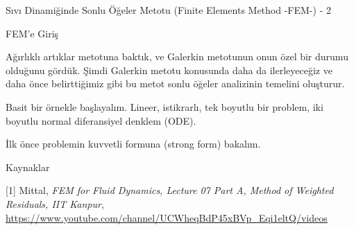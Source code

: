 \documentclass[12pt,fleqn]{article}\usepackage{../../common}
\begin{document}
Sıvı Dinamiğinde Sonlu Öğeler Metotu (Finite Elements Method -FEM-) - 2

FEM'e Giriş

Ağırlıklı artıklar metotuna baktık, ve Galerkin metotunun onun özel bir durumu
olduğunu gördük. Şimdi Galerkin metotu konusunda daha da ilerleyeceğiz ve daha
önce belirttiğimiz gibi bu metot sonlu öğeler analizinin temelini oluşturur.

Basit bir örnekle başlayalım. Lineer, istikrarlı, tek boyutlu bir problem, iki
boyutlu normal diferansiyel denklem (ODE).

İlk önce problemin kuvvetli formuna (strong form) bakalım.



Kaynaklar

[1] Mittal, {\em FEM for Fluid Dynamics, Lecture 07 Part A, Method of Weighted Residuals, IIT Kanpur},
    \url{https://www.youtube.com/channel/UCWheqBdP45xBVp_Eqi1eltQ/videos}
\end{document}
